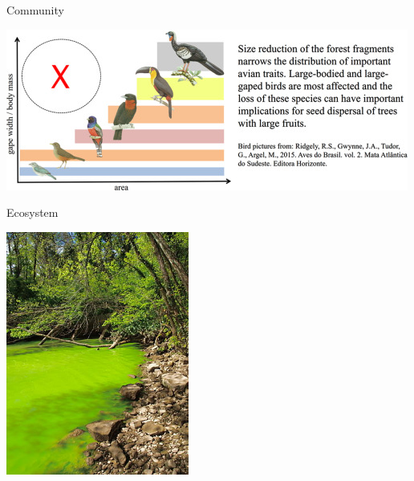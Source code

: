 \documentclass[12pt]{beamer}
\begin{document}
\begin{frame}

	\begin{flushright}
	  \Large \textcolor{boss2}{Community} 
	\end{flushright}
  
  \begin{center}
    \includegraphics[width=\textwidth]{figs/community.jpg}
  \end{center}
  \let\thefootnote\relax{}
\end{frame}







\begin{frame}

	\begin{flushright}
	  \Large \textcolor{boss2}{Ecosystem} 
	\end{flushright}

  \begin{center}
    \includegraphics[width=0.45\textwidth]{figs/ecosystem.jpg}
  \end{center}
  \let\thefootnote\relax{}
\end{frame}
\end{document}
